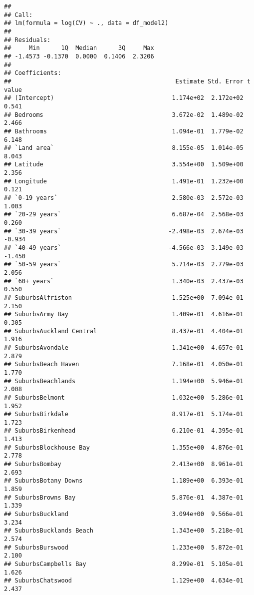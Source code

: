 \documentclass[
]{article}
\begin{document}
\begin{verbatim}
## 
## Call:
## lm(formula = log(CV) ~ ., data = df_model2)
## 
## Residuals:
##     Min      1Q  Median      3Q     Max 
## -1.4573 -0.1370  0.0000  0.1406  2.3206 
## 
## Coefficients:
##                                              Estimate Std. Error t value
## (Intercept)                                 1.174e+02  2.172e+02   0.541
## Bedrooms                                    3.672e-02  1.489e-02   2.466
## Bathrooms                                   1.094e-01  1.779e-02   6.148
## `Land area`                                 8.155e-05  1.014e-05   8.043
## Latitude                                    3.554e+00  1.509e+00   2.356
## Longitude                                   1.491e-01  1.232e+00   0.121
## `0-19 years`                                2.580e-03  2.572e-03   1.003
## `20-29 years`                               6.687e-04  2.568e-03   0.260
## `30-39 years`                              -2.498e-03  2.674e-03  -0.934
## `40-49 years`                              -4.566e-03  3.149e-03  -1.450
## `50-59 years`                               5.714e-03  2.779e-03   2.056
## `60+ years`                                 1.340e-03  2.437e-03   0.550
## SuburbsAlfriston                            1.525e+00  7.094e-01   2.150
## SuburbsArmy Bay                             1.409e-01  4.616e-01   0.305
## SuburbsAuckland Central                     8.437e-01  4.404e-01   1.916
## SuburbsAvondale                             1.341e+00  4.657e-01   2.879
## SuburbsBeach Haven                          7.168e-01  4.050e-01   1.770
## SuburbsBeachlands                           1.194e+00  5.946e-01   2.008
## SuburbsBelmont                              1.032e+00  5.286e-01   1.952
## SuburbsBirkdale                             8.917e-01  5.174e-01   1.723
## SuburbsBirkenhead                           6.210e-01  4.395e-01   1.413
## SuburbsBlockhouse Bay                       1.355e+00  4.876e-01   2.778
## SuburbsBombay                               2.413e+00  8.961e-01   2.693
## SuburbsBotany Downs                         1.189e+00  6.393e-01   1.859
## SuburbsBrowns Bay                           5.876e-01  4.387e-01   1.339
## SuburbsBuckland                             3.094e+00  9.566e-01   3.234
## SuburbsBucklands Beach                      1.343e+00  5.218e-01   2.574
## SuburbsBurswood                             1.233e+00  5.872e-01   2.100
## SuburbsCampbells Bay                        8.299e-01  5.105e-01   1.626
## SuburbsChatswood                            1.129e+00  4.634e-01   2.437

\end{verbatim}
\end{document}
